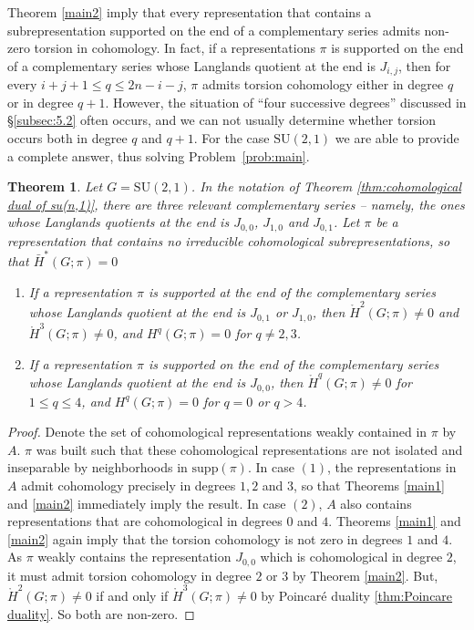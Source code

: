 \documentclass[12pt,reqno]{amsart}
\newtheorem{theorem}{Theorem}[section]
\theoremstyle{definition}
\newcommand{\torH}{\mathring{H}}
\begin{document}
Theorem \ref{main2} imply that every representation that contains a subrepresentation supported on the end of a complementary series admits non-zero torsion in cohomology. In fact, if a representations $\pi$ is supported on the end of a complementary series whose Langlands quotient at the end is $J_{i,j}$, then for every $i+j+1 \leq q \leq 2n-i-j$, $\pi$ admits torsion cohomology either in degree $q$ or in degree $q+1$. However, the situation of ``four successive degrees'' discussed in \S\ref{subsec:5.2} often occurs, and we can not usually determine whether torsion occurs both in degree $q$ and $q+1$. For the case $\mathrm{SU}(2,1)$ we are able to provide a complete answer,
thus solving Problem~\ref{prob:main}.
\begin{theorem}\label{thm:non-Hausdorff-su21}
    Let $G=\mathrm{SU}(2,1)$. In the notation of Theorem \ref{thm:cohomological dual of su(n,1)}, there are three relevant complementary series -- namely, the ones whose Langlands quotients at the end is $J_{0,0}$, $J_{1,0}$ and $J_{0,1}$. Let $\pi$ be a representation that contains no irreducible cohomological subrepresentations, so that $\bar{H}^*(G;\pi)=0$
    \begin{enumerate}
        \item If a representation $\pi$ is supported at the end of the complementary series whose Langlands quotient at the end is $J_{0,1}$ or $J_{1,0}$, then $\torH^2(G;\pi) \ne 0$ and $\torH^3(G;\pi) \ne 0$, and $H^q(G;\pi)=0$ for $q \ne 2,3$.
        \item If a representation $\pi$ is supported on the end of the complementary series whose Langlands quotient at the end is $J_{0,0}$, then $\torH^q(G;\pi) \ne 0$ for $1 \leq q \leq 4$, and $H^q(G;\pi)=0$ for $q=0$ or $q>4$.
    \end{enumerate}
\end{theorem}
\begin{proof}
    Denote the set of cohomological representations weakly contained in $\pi$ by $A$. $\pi$ was built such that these cohomological representations are not isolated and inseparable by neighborhoods in $\mathrm{supp}(\pi)$. In case $(1)$, the representations in $A$ admit cohomology precisely in degrees $1,2$ and $3$, so that Theorems \ref{main1} and \ref{main2} immediately imply the result. In case $(2)$, $A$ also contains representations that are cohomological in degrees $0$ and $4$. Theorems \ref{main1} and \ref{main2} again imply that the torsion cohomology is not zero in degrees $1$ and $4$. As $\pi$ weakly contains the representation $J_{0,0}$ which is cohomological in degree $2$, it must admit torsion cohomology in degree $2$ or $3$ by Theorem \ref{main2}. But, $\torH^2(G;\pi) \ne 0$ if and only if $\torH^3(G;\pi) \ne 0$ by Poincar\'e duality \ref{thm:Poincare duality}. So both are non-zero.
\end{proof}
\end{document}
